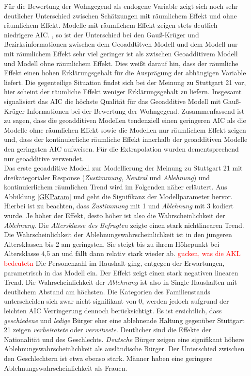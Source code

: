 \documentclass{Vorlage}
\begin{document}
Für die Bewertung der Wohngegend als endogene Variable zeigt sich noch sehr deutlicher Unterschied zwischen Schätzungen mit räumlichem Effekt und ohne räumlichem Effekt. Modelle mit räumlichem Effekt zeigen stets deutlich niedrigere AIC.
, so ist der Unterschied bei den Gauß-Krüger und Bezirksinformationen zwischen dem Geoaddtitven Modell und dem Modell nur mit räumlichem Effekt sehr viel geringer ist als zwischen Geoadditivem Modell und Modell ohne räumlichem Effekt. Dies weißt darauf hin, dass der räumliche Effekt einen hohen Erklärungsgehalt für die Ausprägung der abhängigen Variable liefert. Die gegenteilige Situation findet sich bei der Meinung zu Stuttgart 21 vor, hier scheint der räumliche Effekt weniger Erklärungsgehalt zu liefern. Insgesamt signalisiert das AIC die höchste Qualität für das Geoadditive Modell mit Gauß-Krüger Informationen bei der Bewertung der Wohngegend. Zusammenfassend ist zu sagen, dass die geoadditiven Modellen tendenziell einen geringeren AIC als die Modelle ohne räumlichen Effekt sowie die Modellen nur räumlichem Effekt zeigen und, dass der kontinuierliche räumliche Effekt innerhalb der geoadditiven Modelle den geringsten AIC aufweisen. Für die Extrapolation wurden dementsprechend nur geoadditive verwendet.\\
Das erste geoadditive Modell zur Modellierung der Meinung zu Stuttgart 21 mit dreikategorialer Response (\textit{Zustimmung}, \textit{Neutral} und \textit{Ablehnung}) und kontinuierlichem räumlichen Trend wird im Folgenden näher erläutert. Aus Abbildung \ref{GKParam} und  geht die Signifikanz der Modellparameter hervor. Hierbei ist zu beachten, dass \textit{Zustimmung} mit 1 und \textit{Ablehnung} mit 3 kodiert wurde. Je höher der Effekt, desto höher ist also die Wahrscheinlichkeit der \textit{Ablehnung}. Die \textit{Altersklasse des Befragten} zeigte einen stark nichtlinearen Trend. Die Wahrscheinlichkeit der Ablehnungswahrscheinlichkeit ist in den jüngeren Altersklassen bis 2 am geringsten. Sie steigt bis zu ihrem Höhepunkt bei Altersklasse  4,5 an und fällt dann relativ stark wieder ab. \textcolor{red}{gucken, was die AKL bedeutetn} Die Personenzahl im Haushalt ging, entgegen der Erwartungen, parametrisch in das Modell ein. Der Effekt zeigt einen stark negativen linearen Trend. Die Wahrscheinlichkeit der \textit{Ablehnung} ist also in Single-Haushalten mit deutlichem Abstand am höchsten. Die Kategorien des Familienstands unterscheiden sich zwar nicht signifikant von 0, werden jedoch aufgrund der leichten AIC Verringerung dennoch berücksichtigt. Es ist ersichtlich, dass \textit{geschiedene} und \textit{ledige} Bürger eher eine ablehnende Haltung gegenüber Stuttgart 21 zeigen \textit{verheiratete} oder \textit{verwitwete}. Deutlicher sind die Effekte der Nationalität und des Geschlechts. \textit{Deutsche} Bürger zeigen eine signifikant höhere Ablehnungswahrscheinlichkeit als ausländische Bürger. Der Unterschied zwischen den Geschlechtern ist etwa ebenso stark. Männer haben eine geringere Ablehnungswahrscheinlichkeit als Frauen.
\end{document}
